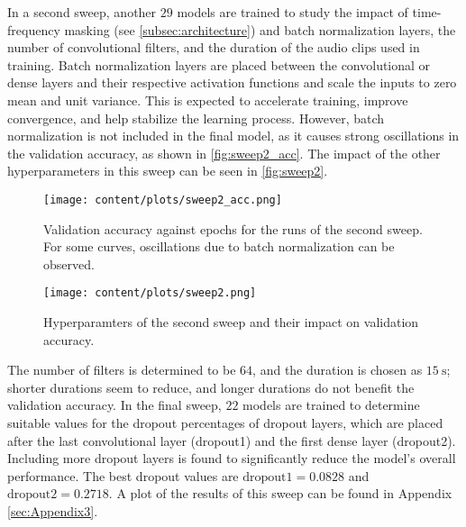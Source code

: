 In a second sweep, another $\num{29}$ models are trained to study the impact of time-frequency masking (see \ref{subsec:architecture}) and batch normalization layers, 
the number of convolutional filters, and the duration of the audio clips used in training. Batch normalization layers are placed between the convolutional or dense layers 
and their respective activation functions and scale the inputs to zero mean and unit variance. This is expected to accelerate training, improve convergence, and help stabilize 
the learning process. However, batch normalization is not included in the final model, as it causes strong oscillations in the validation accuracy, as shown in \autoref{fig:sweep2_acc}.
The impact of the other hyperparameters in this sweep can be seen in \autoref{fig:sweep2}.
\begin{figure}
    \centering
    \texttt{[image: content/plots/sweep2\_acc.png]}
    \caption{Validation accuracy against epochs for the runs of the second sweep. For some curves, oscillations due to batch normalization can be observed.}
    \label{fig:sweep2_acc}
\end{figure}
\begin{figure}
    \centering 
    \texttt{[image: content/plots/sweep2.png]}
    \caption{Hyperparamters of the second sweep and their impact on validation accuracy.}
    \label{fig:sweep2}
\end{figure}
The number of filters is determined to be $\num{64}$, and the duration is chosen as $\qty{15}{\second}$; shorter durations seem to reduce, and longer durations do not benefit 
the validation accuracy.
In the final sweep, $\num{22}$ models are trained to determine suitable values for the dropout percentages of dropout layers, which are placed after the last convolutional layer 
(dropout1) and the first dense layer (dropout2). Including more dropout layers is found to significantly reduce the model's overall performance. The best dropout values are
$\text{dropout1} = \num{0.0828}$ and $\text{dropout2} = \num{0.2718}$. A plot of the results of this sweep can be found in Appendix \ref{sec:Appendix3}.
